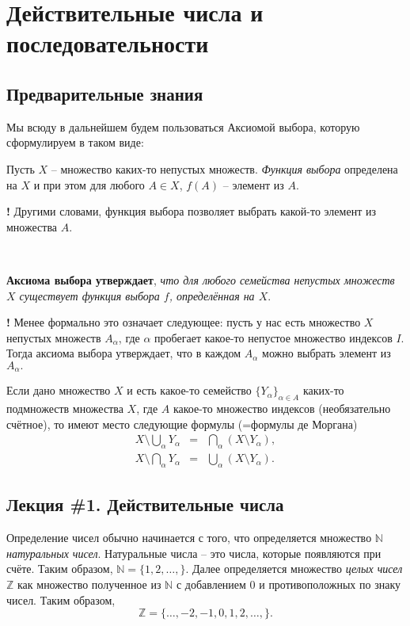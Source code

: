 \chapter{Действительные числа и последовательности}

\section*{Предварительные знания}

Мы всюду в дальнейшем будем пользоваться Аксиомой выбора, которую сформулируем в таком виде:

Пусть $X$ -- множество каких-то непустых множеств. \textit{Функция выбора} определена на $X$ и при этом для любого $A \in X$, $f(A)$ -- элемент из $A$. 

\begin{mydanger}{\bf{!}}
Другими словами, функция выбора позволяет выбрать какой-то элемент из множества $A.$
\end{mydanger}~

\textbf{Аксиома выбора утверждает},\label{AC}
 \textit{что для любого семейства непустых множеств $X$ существует функция выбора $f$, определённая на $X$}.\\    

\begin{mydanger}{\bf{!}}
 Менее формально это означает следующее: пусть у нас есть множество $X$ непустых множеств $A_\alpha$, где $\alpha$ пробегает какое-то непустое множество индексов $I.$ Тогда аксиома выбора утверждает, что в каждом $A_\alpha$ можно выбрать элемент из $A_\alpha.$
\end{mydanger}

Если дано множество $X$ и есть какое-то семейство $\{Y_\alpha\}_{\alpha \in A}$ каких-то подмножеств множества $X$, где $A$ какое-то множество индексов (необязательно счётное), то имеют место следующие формулы (=формулы де Моргана) 
\begin{eqnarray}
    X \setminus \bigcup_\alpha Y_\alpha &=& \bigcap_\alpha (X \setminus Y_\alpha), \label{dM1}\\
    X \setminus \bigcap_\alpha Y_\alpha &=& \bigcup_\alpha (X \setminus Y_\alpha). \label{dM2}
\end{eqnarray}


\section{Лекция \#1. Действительные числа}

Определение чисел обычно начинается с того, что определяется множество $\mathbb{N}$ \textit{натуральных чисел}. Натуральные числа -- это числа, которые появляются при счёте. Таким образом, $\mathbb{N} = \{1,2,\ldots,\}$. Далее определяется множество \textit{целых чисел} $\mathbb{Z}$ как множество полученное из $\mathbb{N}$ с добавлением $0$ и противоположных по знаку чисел. Таким образом,
\[
\mathbb{Z} = \{\ldots, -2,-1,0,1,2,\ldots,\}.
\]

